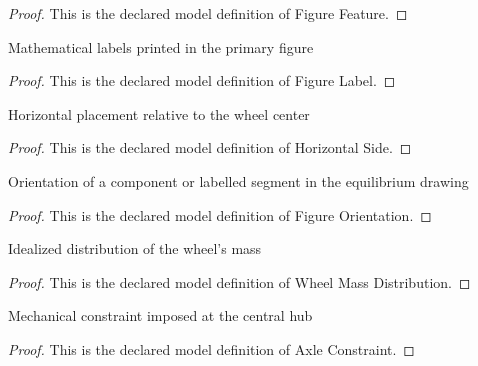 \begin{proof}
  This is the declared model definition of Figure Feature.
\end{proof}
\begin{definition}
  \label{def:physics:phyx-mini-0272:phyxminiproblems-problemphyxmini0272-figurelabel}
  Mathematical labels printed in the primary figure
\end{definition}
\begin{proof}
  This is the declared model definition of Figure Label.
\end{proof}
\begin{definition}
  \label{def:physics:phyx-mini-0272:phyxminiproblems-problemphyxmini0272-horizontalside}
  Horizontal placement relative to the wheel center
\end{definition}
\begin{proof}
  This is the declared model definition of Horizontal Side.
\end{proof}
\begin{definition}
  \label{def:physics:phyx-mini-0272:phyxminiproblems-problemphyxmini0272-figureorientation}
  Orientation of a component or labelled segment in the equilibrium drawing
\end{definition}
\begin{proof}
  This is the declared model definition of Figure Orientation.
\end{proof}
\begin{definition}
  \label{def:physics:phyx-mini-0272:phyxminiproblems-problemphyxmini0272-wheelmassdistribution}
  Idealized distribution of the wheel's mass
\end{definition}
\begin{proof}
  This is the declared model definition of Wheel Mass Distribution.
\end{proof}
\begin{definition}
  \label{def:physics:phyx-mini-0272:phyxminiproblems-problemphyxmini0272-axleconstraint}
  Mechanical constraint imposed at the central hub
\end{definition}
\begin{proof}
  This is the declared model definition of Axle Constraint.
\end{proof}
